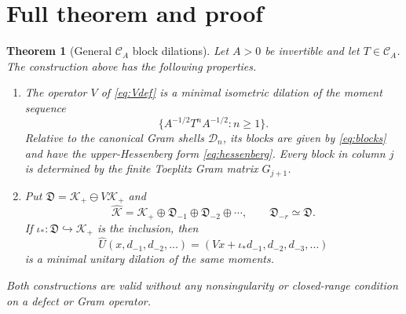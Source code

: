 \documentclass[11pt]{article}
\newtheorem{theorem}{Theorem}
\newcommand{\Kp}{\mathcal K_+}
\begin{document}
\section{Full theorem and proof}

\begin{theorem}[General $\mathcal C_A$ block dilations]\label{thm:main}
Let $A>0$ be invertible and let $T\in\mathcal C_A$.  The construction
above has the following properties.
\begin{enumerate}
\item The operator $V$ of \eqref{eq:Vdef} is a minimal isometric
dilation of the moment sequence
\[
 \bigl\{A^{-1/2}T^nA^{-1/2}:n\geq1\bigr\}.
\]
Relative to the canonical Gram shells $\mathcal D_n$, its blocks are
given by \eqref{eq:blocks} and have the upper-Hessenberg form
\eqref{eq:hessenberg}.  Every block in column $j$ is determined by the
finite Toeplitz Gram matrix $G_{j+1}$.
\item Put $\mathfrak D=\Kp\ominus V\Kp$ and
\[
 \widehat{\mathcal K}=\Kp\oplus\mathfrak D_{-1}
       \oplus\mathfrak D_{-2}\oplus\cdots,
 \qquad \mathfrak D_{-r}\simeq\mathfrak D.
\]
If $\iota_*:\mathfrak D\hookrightarrow\Kp$ is the inclusion, then
\begin{equation}\label{eq:Uformula}
 \widehat U(x,d_{-1},d_{-2},\ldots)
   =(Vx+\iota_*d_{-1},d_{-2},d_{-3},\ldots)
\end{equation}
is a minimal unitary dilation of the same moments.
\end{enumerate}
Both constructions are valid without any nonsingularity or closed-range
condition on a defect or Gram operator.
\end{theorem}
\end{document}
